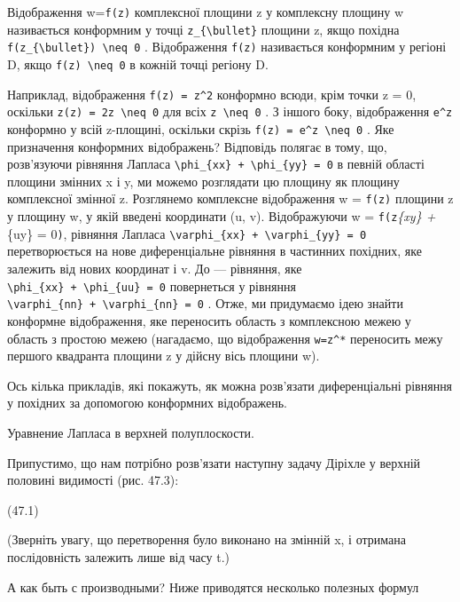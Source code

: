 \documentclass[
  ukrainian,
]{article}
\begin{document}
Відображення w=\texttt{f(z)} комплексної площини z у комплексну площину
w називається конформним у точці \texttt{z\_\{\textbackslash{}bullet\}}
площини z, якщо похідна
\texttt{f\textquotesingle{}(z\_\{\textbackslash{}bullet\})\ \textbackslash{}neq\ 0}
. Відображення \texttt{f(z)} називається конформним у регіоні D, якщо
\texttt{f\textquotesingle{}(z)\ \textbackslash{}neq\ 0} в кожній точці
регіону D.

Наприклад, відображення \texttt{f(z)\ =\ z\^{}2} конформно всюди, крім
точки z = 0, оскільки
\texttt{z\textquotesingle{}(z)\ =\ 2z\ \textbackslash{}neq\ 0} для всіх
\texttt{z\ \textbackslash{}neq\ 0} . З іншого боку, відображення
\texttt{e\^{}z} конформно у всій z-площині, оскільки скрізь
\texttt{f\textquotesingle{}(z)\ =\ e\^{}z\ \textbackslash{}neq\ 0} . Яке
призначення конформних відображень? Відповідь полягає в тому, що,
розв'язуючи рівняння Лапласа
\texttt{\textbackslash{}phi\_\{xx\}\ +\ \textbackslash{}phi\_\{yy\}\ =\ 0}
в певній області площини змінних x і y, ми можемо розглядати цю площину
як площину комплексної змінної z. Розглянемо комплексне відображення w =
\texttt{f(z)} площини z у площину w, у якій введені координати (u, v).
Відображуючи w = \texttt{f(z}\phi\emph{\{xy\} + \phi}\{uy\} =
0\texttt{)}, рівняння Лапласа
\texttt{\textbackslash{}varphi\_\{xx\}\ +\ \textbackslash{}varphi\_\{yy\}\ =\ 0}
перетворюється на нове диференціальне рівняння в частинних похідних, яке
залежить від нових координат і v. До --- рівняння, яке
\texttt{\textbackslash{}phi\_\{xx\}\ +\ \textbackslash{}phi\_\{uu\}\ =\ 0}
повернеться у рівняння
\texttt{\textbackslash{}varphi\_\{nn\}\ +\ \textbackslash{}varphi\_\{nn\}\ =\ 0}
. Отже, ми придумаємо ідею знайти конформне відображення, яке переносить
область з комплексною межею у область з простою межею (нагадаємо, що
відображення \texttt{w=z\^{}*} переносить межу першого квадранта площини
z у дійсну вісь площини w).

Ось кілька прикладів, які покажуть, як можна розв'язати диференціальні
рівняння у похідних за допомогою конформних відображень.

Уравнение Лапласа в верхней полуплоскости.

Припустимо, що нам потрібно розв'язати наступну задачу Діріхле у верхній
половині видимості (рис. 47.3):

(47.1)

(Зверніть увагу, що перетворення було виконано на змінній x, і отримана
послідовність залежить лише від часу t.)

А как быть с производными? Ниже приводятся несколько полезных формул
\end{document}
